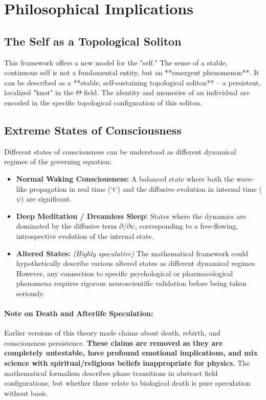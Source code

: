 \documentclass[12pt, a4paper]{article}
\begin{document}
\section{Philosophical Implications}

\subsection{The Self as a Topological Soliton}
This framework offers a new model for the "self." The sense of a stable, continuous self is not a fundamental entity, but an **emergent phenomenon**. It can be described as a **stable, self-sustaining topological soliton** – a persistent, localized "knot" in the \( \Theta \) field. The identity and memories of an individual are encoded in the specific topological configuration of this soliton.

\subsection{Extreme States of Consciousness}
Different states of consciousness can be understood as different dynamical regimes of the governing equation:
\begin{itemize}
    \item \textbf{Normal Waking Consciousness:} A balanced state where both the wave-like propagation in real time (`t`) and the diffusive evolution in internal time (\(\psi\)) are significant.
    \item \textbf{Deep Meditation / Dreamless Sleep:} States where the dynamics are dominated by the diffusive term \( \partial/\partial\psi \), corresponding to a free-flowing, introspective evolution of the internal state.
    \item \textbf{Altered States:} \textit{(Highly speculative)} The mathematical framework could hypothetically describe various altered states as different dynamical regimes. However, any connection to specific psychological or pharmacological phenomena requires rigorous neuroscientific validation before being taken seriously.
\end{itemize}

\paragraph{Note on Death and Afterlife Speculation:} Earlier versions of this theory made claims about death, rebirth, and consciousness persistence. \textbf{These claims are removed as they are completely untestable, have profound emotional implications, and mix science with spiritual/religious beliefs inappropriate for physics.} The mathematical formalism describes phase transitions in abstract field configurations, but whether these relate to biological death is pure speculation without basis.
\end{document}
